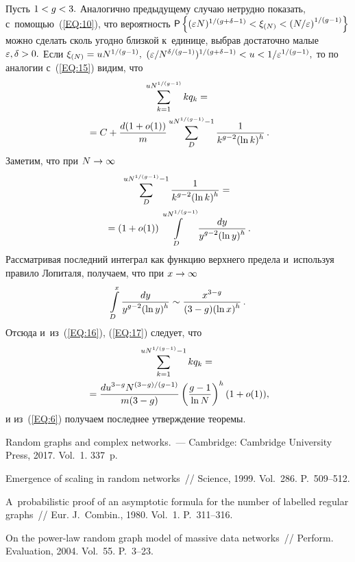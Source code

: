 \begin{multicols}{2}
Пусть $1\hm<g\hm<3.$ Аналогично предыдущему случаю нетрудно показать, 
с~помощью~(\ref{EQ:10}), что вероятность
${\sf P}\left\{(\varepsilon N)^{{1}/({g+\delta -1})}\hm<
\xi_{(N)}<\left({N}/{\varepsilon}\right)^{{1}/({g-1})}\right\}
$
можно сделать сколь угодно близкой к~единице, выбрав достаточно малые~$\varepsilon,
\delta \hm>0.$ Если $\xi_{(N)}\hm=uN^{{1}/({g-1})},$
$(\varepsilon /N^{{\delta}/({g-1})})^{{1}/({g+\delta-1})}\hm <u\hm< 
1/\varepsilon^{{1}/({g-1})},$
то по аналогии с~(\ref{EQ:15}) видим, что
\begin{multline}
\label{EQ:16}
\sum\limits_{k=1}^{uN^{{1}/({g-1})}}kq_k={}\\
{}=C+\displaystyle\frac{\displaystyle d(1+o(1))\mathstrut}{\displaystyle m\mathstrut}
\sum\limits_D^{uN^{{1}/({g-1})}-1}\displaystyle\frac{\displaystyle 1\mathstrut}{\displaystyle k^{g-2}(\ln k)^h\mathstrut}\,.
\end{multline}
Заметим, что при $N\hm\rightarrow \infty$
\begin{multline}
\label{EQ:17}
\sum\limits_D^{uN^{{1}/({g-1})}-1}\displaystyle\frac{\displaystyle 1\mathstrut}{\displaystyle k^{g-2}(\ln k)^h\mathstrut}={}\\
{}=
(1+o(1))\int\limits_D^{uN^{{1}/({g-1})}} \displaystyle\frac{\displaystyle dy\mathstrut}{\displaystyle y^{g-2}(\ln y)^h\mathstrut}\,.
\end{multline}
Рассматривая последний интеграл как функцию верхнего предела и~используя 
правило Лопиталя, получаем, что при $x\hm\rightarrow \infty$
$$
\int\limits_D^x \displaystyle\frac{\displaystyle dy\mathstrut}{\displaystyle y^{g-2}(\ln y)^h\mathstrut} \sim \displaystyle\frac{\displaystyle x^{3-g}\mathstrut}{\displaystyle (3-g)(\ln x)^h\mathstrut}\,.
$$
Отсюда и~из~(\ref{EQ:16}), (\ref{EQ:17}) следует, что
\begin{multline*}
\sum\limits_{k=1}^{uN^{{1}/({g-1})}-1} kq_k={}\\
{}=
\displaystyle\frac{\displaystyle du^{3-g}N^{({3-g})/({g-1})}\mathstrut}{\displaystyle m(3-g)\mathstrut}\left(\displaystyle\frac{\displaystyle g-1\mathstrut}{\displaystyle \ln N\mathstrut}\right)^h(1+o(1)),
\end{multline*}
и из~(\ref{EQ:6}) получаем последнее утверждение теоремы.

{\small\frenchspacing
 {%
 \begin{thebibliography}{9}
 Random graphs and complex networks.~--- Cambridge:
Cambridge University Press, 2017.  Vol.~1. 337~p.

 Emergence of scaling in random networks~// 
Science, 1999. Vol.~286. P.~509--512.

 A~probabilistic proof of an asymptotic formula
for the number of labelled regular graphs~// Eur. J.~Combin., 1980. Vol.~1. P.~311--316.

 On the power-law random graph model of massive
data networks~// Perform. Evaluation, 2004. Vol.~55. P.~3--23.



\end{thebibliography}}}
\end{multicols}
